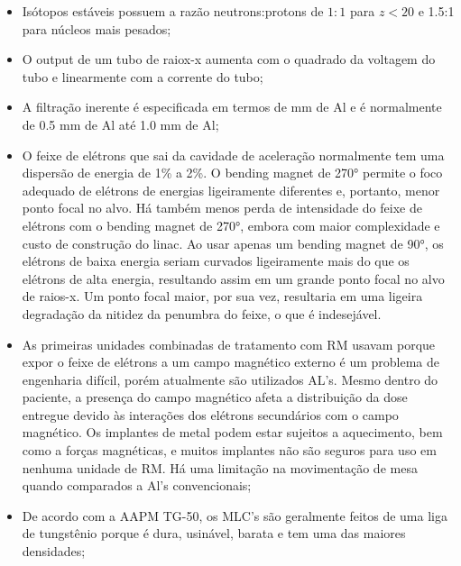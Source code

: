 \documentclass[11pt,a4paper]{article}
\newcounter{exemplo}
\begin{document}
\begin{exemplo}[Física]

    \begin{itemize}
        \item Isótopos estáveis possuem a razão neutrons:protons de $1:1$ para $z <  20$ e 1.5:1 para núcleos mais pesados;
        
        \item O output de um tubo de raiox-x aumenta com o quadrado da voltagem do tubo  e linearmente com a corrente do tubo;
        
        \item A filtração inerente é especificada em termos de mm de Al e é normalmente de 0.5 mm de Al até 1.0 mm de Al;
        
        \item O feixe de elétrons que sai da cavidade de aceleração normalmente tem uma dispersão de energia de 1\% a 2\%. O bending magnet de \ang{270} permite o foco adequado de elétrons de energias ligeiramente diferentes e, portanto, menor ponto focal no alvo. Há também menos perda de intensidade do feixe de elétrons com o bending magnet de \ang{270}, embora com maior complexidade e custo de construção do linac. Ao usar apenas um bending magnet de \ang{90}, os elétrons de baixa energia seriam curvados ligeiramente mais do que os elétrons de alta energia, resultando assim em um grande ponto focal no alvo de raios-x. Um ponto focal maior, por sua vez, resultaria em uma ligeira degradação da nitidez da penumbra do feixe, o que é indesejável.
        
        \item As primeiras unidades combinadas de tratamento com RM usavam  porque expor o feixe de elétrons a um campo magnético externo é um problema de engenharia difícil, porém atualmente são utilizados AL's. Mesmo dentro do paciente, a presença do campo magnético afeta a distribuição da dose entregue devido às interações dos elétrons secundários com o campo magnético. Os implantes de metal podem estar sujeitos a aquecimento, bem como a forças magnéticas, e muitos implantes não são seguros para uso em nenhuma unidade de RM. Há uma limitação na movimentação de mesa quando comparados a Al's convencionais;
        
        \item De acordo com a AAPM TG-50, os MLC's são geralmente feitos de uma liga de tungstênio porque é dura, usinável, barata e tem uma das maiores densidades;
        

\end{itemize}
\end{exemplo}
\end{document}
